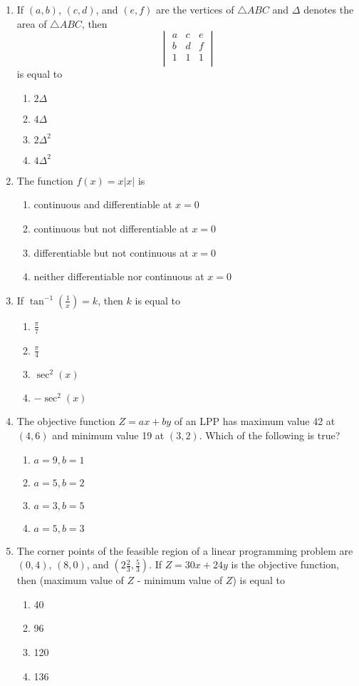 \documentclass{article}
\begin{document}
\begin{enumerate}
\item If $(a, b)$, $(c, d)$, and $(e, f)$ are the vertices of $\triangle ABC$ and $\Delta$ denotes the area of $\triangle ABC$, then
\[
\begin{vmatrix}
a & c & e \\
b & d & f \\
1 & 1 & 1 \\
\end{vmatrix}
\]
is equal to
\begin{enumerate}
\item $2\Delta$
\item $4\Delta$
\item $2\Delta^2$
\item $4\Delta^2$
\end{enumerate}

\item The function $f(x) = x|x|$ is
\begin{enumerate}
\item continuous and differentiable at $x = 0$
\item continuous but not differentiable at $x = 0$
\item differentiable but not continuous at $x = 0$
\item neither differentiable nor continuous at $x = 0$
\end{enumerate}

\item If $\tan^{-1}\left(\frac{1}{x}\right) = k$, then $k$ is equal to
\begin{enumerate}
\item $\frac{\pi}{7}$
\item $\frac{\pi}{4}$
\item $\sec^2(x)$
\item $-\sec^2(x)$
\end{enumerate}

\item The objective function $Z = ax + by$ of an LPP has maximum value 42 at $(4, 6)$ and minimum value 19 at $(3, 2)$. Which of the following is true?
\begin{enumerate}
\item $a = 9, b = 1$
\item $a = 5, b = 2$
\item $a = 3, b = 5$
\item $a = 5, b = 3$
\end{enumerate}

\item The corner points of the feasible region of a linear programming problem are $(0, 4)$, $(8, 0)$, and $(2\frac{2}{3}, \frac{5}{3})$. If $Z = 30x + 24y$ is the objective function, then (maximum value of $Z$ - minimum value of $Z$) is equal to
\begin{enumerate}
\item 40
\item 96
\item 120
\item 136
\end{enumerate}


\end{enumerate}
\end{document}
